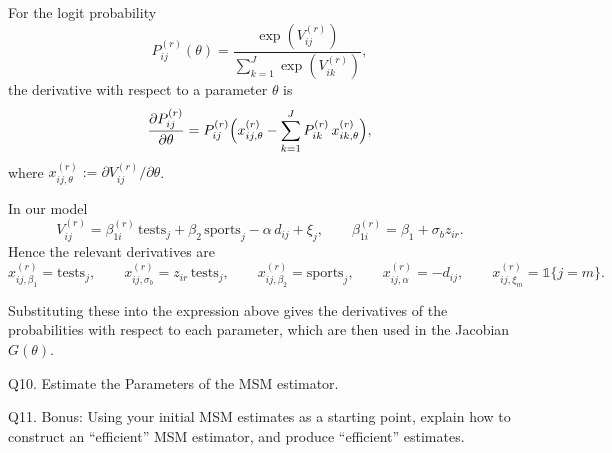 \documentclass{article}
\begin{document}
For the logit probability
\[
P^{(r)}_{ij}(\theta)
= \frac{\exp(V^{(r)}_{ij})}{\sum_{k=1}^J \exp(V^{(r)}_{ik})},
\]
the derivative with respect to a parameter $\theta$ is
\[
\frac{\partial P^{(r)}_{ij}}{\partial \theta}
= P^{(r)}_{ij}\Bigl(x^{(r)}_{ij,\theta}
- \sum_{k=1}^J P^{(r)}_{ik}\,x^{(r)}_{ik,\theta}\Bigr),
\]
where $x^{(r)}_{ij,\theta} := \partial V^{(r)}_{ij}/\partial\theta$.

\vspace{5mm}

In our model 
\[
V^{(r)}_{ij}
= \beta_{1i}^{(r)}\,\text{tests}_j
+ \beta_2\,\text{sports}_j
- \alpha\,d_{ij}
+ \xi_j,
\qquad
\beta_{1i}^{(r)}=\beta_1+\sigma_b z_{ir}.
\]
Hence the relevant derivatives are
\[
x^{(r)}_{ij,\beta_1}=\text{tests}_j,\qquad
x^{(r)}_{ij,\sigma_b}=z_{ir}\,\text{tests}_j,\qquad
x^{(r)}_{ij,\beta_2}=\text{sports}_j,\qquad
x^{(r)}_{ij,\alpha}=-d_{ij},\qquad
x^{(r)}_{ij,\xi_m}=\mathbb{1}\{j=m\}.
\]

Substituting these into the expression above gives the derivatives of the probabilities with respect to each parameter, which are then used in the Jacobian $G(\theta)$.

\begin{tcolorbox}
Q10. Estimate the Parameters of the MSM estimator.
\end{tcolorbox}

\begin{table}[H]
\centering
{}
\caption{Estimation results for logit models.}
\end{table}

\begin{tcolorbox}
Q11. Bonus: Using your initial MSM estimates as a starting point, explain how to construct an ``efficient'' MSM estimator, and produce ``efficient'' estimates.
\end{tcolorbox}
\end{document}
